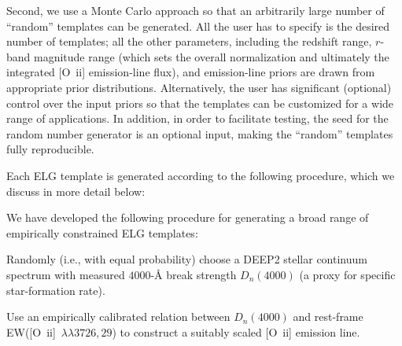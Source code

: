 \documentclass[12pt]{article}
\newcommand{\oii}{[O~{\sc ii}]}
\newcommand{\ewoiilam}{EW([O~{\sc ii}]~\ensuremath{\lambda\lambda3726,29})}
\begin{document}
Second, we use a Monte Carlo approach so that an arbitrarily large number of
``random'' templates can be generated.  All the user has to specify is the
desired number of templates; all the other parameters, including the redshift
range, $r$-band magnitude range (which sets the overall normalization and
ultimately the integrated \oii{} emission-line flux), and emission-line priors
are drawn from appropriate prior distributions.  Alternatively, the user has
significant (optional) control over the input priors so that the templates can
be customized for a wide range of applications.  In addition, in order to
facilitate testing, the seed for the random number generator is an optional
input, making the ``random'' templates fully reproducible.



Each ELG template is generated according to the following procedure, which we
discuss in more detail below:

We have developed the following procedure for generating a broad range of
empirically constrained ELG templates:
\begin{enumerate*}
\item{Randomly (i.e., with equal probability) choose a DEEP2 stellar continuum
  spectrum with measured $4000$-\AA{} break strength $D_{n}(4000)$ (a proxy for
  specific star-formation rate).}
\item{Use an empirically calibrated relation between $D_{n}(4000)$ and
  rest-frame \ewoiilam{} to construct a suitably scaled \oii{} emission line.}
\item{}
\end{enumerate*}
\end{document}
